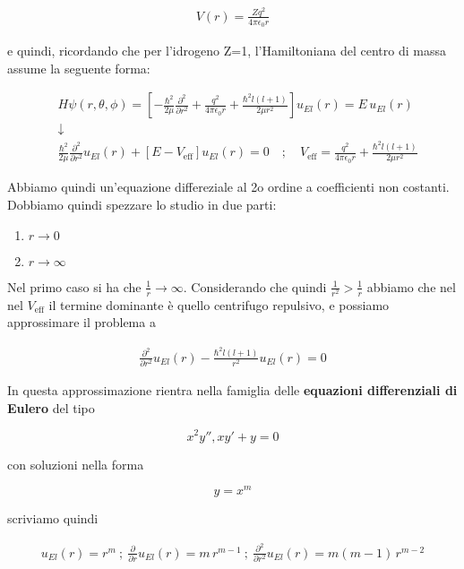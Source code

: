 \begin{align}
V(r)= \frac{Z q^2}{4\pi \epsilon_0 r}
\end{align}

e quindi, ricordando che per l'idrogeno Z=1, l'Hamiltoniana del centro di massa assume la seguente forma:

\begin{align}
{}&H \psi(r,\theta,\phi)= \left[
-\frac{\hbar^2}{2 \mu}\frac{\partial^2}{\partial r^2} + \frac{q^2}{4\pi \epsilon_0 r} +  \frac{\hbar^2 l(l+1)}{2 \mu r^2} \right] u_{E l}(r) = E \, u_{E l}(r) \\
&\downarrow \nonumber \\ 
&\frac{\hbar^2}{2 \mu}\frac{\partial^2}{\partial r^2}u_{E l}(r)  + [E -V_{\text{eff}}] u_{E l}(r) = 0 \quad ; \quad
V_{\text{eff}}= \frac{q^2}{4\pi \epsilon_0 r} +  \frac{\hbar^2 l(l+1)}{2 \mu r^2} \end{align}

Abbiamo quindi un'equazione differeziale al 2o ordine a coefficienti non costanti. Dobbiamo quindi spezzare lo studio in due parti:

\begin{enumerate}
	\item $r \rightarrow 0$
	\item $r \rightarrow \infty$
\end{enumerate}


Nel primo caso si ha che $\frac{1}{r} \rightarrow \infty$. Considerando che quindi $\frac{1}{r^2} > \frac{1}{r}$ abbiamo che nel nel $V_{\text{eff}}$ il termine dominante è quello centrifugo repulsivo, e possiamo approssimare il problema a 

\begin{align}
\frac{\partial^2}{\partial r^2} u_{E l}(r) - \frac{\hbar^2 l(l+1)}{r^2} u_{E l}(r)=0
\end{align}

In questa approssimazione rientra nella famiglia delle \textbf{equazioni differenziali di Eulero} del tipo

\begin{equation}
x^2 y'', xy' +y=0
\end{equation}

con soluzioni nella forma 

\begin{equation}
y=x^m
\end{equation}

scriviamo quindi

\begin{align}
u_{E l}(r)= r^m \: ;\: \frac{\partial }{\partial r}u_{E l}(r) = m \, r^{m-1} \: ;\: \frac{\partial^2}{\partial r^2}u_{E l}(r) = m(m-1) \, r^{m-2}
\end{align}

